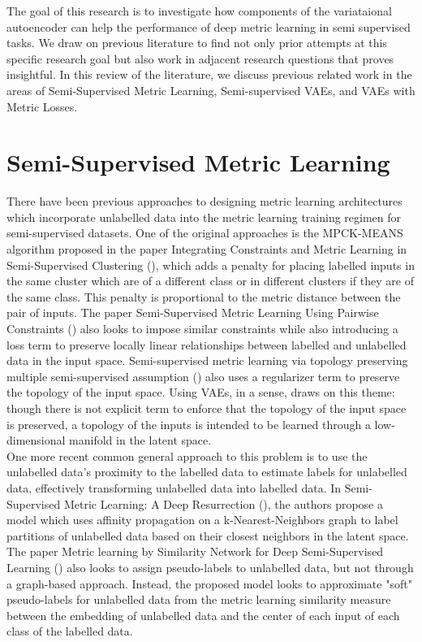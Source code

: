 \documentclass[./dissertation.tex]{subfiles}
\begin{document}

The goal of this research is to investigate how components of the variataional autoencoder can help the performance of deep metric learning in semi supervised tasks. We draw on previous literature to find not only prior attempts at this specific research goal but also work in adjacent research questions that proves insightful. In this review of the literature, we discuss previous related work in the areas of Semi-Supervised Metric Learning, Semi-supervised VAEs, and VAEs with Metric Losses. 


\section{Semi-Supervised Metric Learning}
There have been previous approaches to designing metric learning architectures which incorporate unlabelled data into the metric learning training regimen for semi-supervised datasets. One of the original approaches is the MPCK-MEANS algorithm proposed in the paper Integrating Constraints and Metric Learning in Semi-Supervised Clustering (\cite{bilenko2004integrating}), which adds a penalty for placing labelled inputs in the same cluster which are of a different class or in different clusters if they are of the same class. This penalty is proportional to the metric distance between the pair of inputs. The paper Semi-Supervised Metric Learning Using Pairwise Constraints (\cite{baghshah2009semi}) also looks to impose similar constraints while also introducing a loss term to preserve locally linear relationships between labelled and unlabelled data in the input space. Semi-supervised metric learning via topology preserving multiple semi-supervised assumption (\cite{wang2013semi}) also uses a regularizer term to preserve the topology of the input space. Using VAEs, in a sense, draws on this theme: though there is not explicit term to enforce that the topology of the input space is preserved, a topology of the inputs is intended to be learned through a low-dimensional manifold in the latent space. \\

One more recent common general approach to this problem is to use the unlabelled data's proximity to the labelled data to estimate labels for unlabelled data, effectively transforming unlabelled data into labelled data. In Semi-Supervised Metric Learning: A Deep Resurrection (\cite{dutta2021semi}), the authors propose a model which uses affinity propagation on a k-Nearest-Neighbors graph to label partitions of unlabelled data based on their closest neighbors in the latent space. The paper Metric learning by Similarity Network for Deep Semi-Supervised Learning (\cite{wu2020metric}) also looks to assign pseudo-labels to unlabelled data, but not through a graph-based approach. Instead, the proposed model looks to approximate "soft" pseudo-labels for unlabelled data from the metric learning similarity measure between the embedding of unlabelled data and the center of each input of each class of the labelled data. \\
\end{document}
